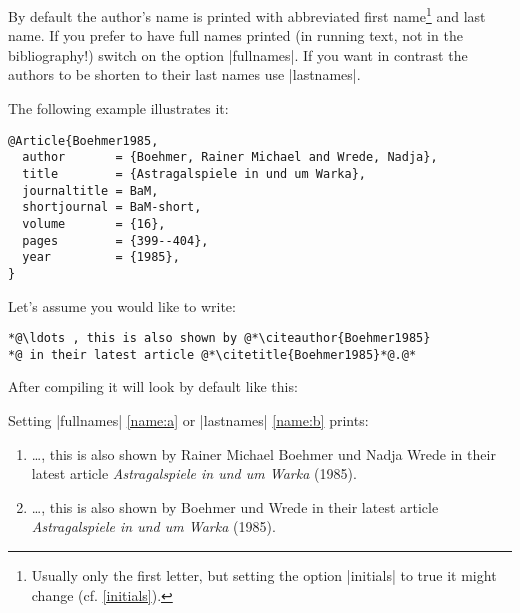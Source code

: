 \documentclass[a4paper,
10pt,
greek,
french,
spanish,
italian,
ngerman,
english
]{ltxdoc}
\begin{document}
By default the author's name is printed with abbreviated first name\footnote{Usually only the first letter, but setting the option |initials| to true it might change (cf. \cref{initials}).} and last name.
If you prefer to have full names printed (in running text, not in the bibliography!) switch on the option |fullnames|.
If you want in contrast the authors to be shorten to their last names use |lastnames|.

The following example illustrates it:

\begin{lstlisting}[style=bibentry,label=Boehmer1985,caption={{@}Article\{Boehmer1985,…\} }]
@Article{Boehmer1985,
  author       = {Boehmer, Rainer Michael and Wrede, Nadja},
  title        = {Astragalspiele in und um Warka},
  journaltitle = BaM,
  shortjournal = BaM-short,
  volume       = {16},
  pages        = {399--404},
  year         = {1985},
}
\end{lstlisting}

Let's assume you would like to write:

\begin{refsection}
\begin{lstlisting}
*@\ldots , this is also shown by @*\citeauthor{Boehmer1985} 
*@ in their latest article @*\citetitle{Boehmer1985}*@.@* \end{lstlisting}

After compiling it will look by default like this: 


Setting |fullnames| \ref{name:a} or |lastnames| \ref{name:b} prints:

\begin{bsp}
\begin{enumerate}
\item\label{name:a} 
\ldots , this is also shown by {\color{red}Rainer Michael Boehmer  und Nadja Wrede} in their latest article \emph{Astragalspiele in und um Warka} (1985).
\item\label{name:b}
\ldots , this is also shown by {\color{red}Boehmer und  Wrede} in their latest article \emph{Astragalspiele in und um Warka} (1985).
\end{enumerate}
\end{bsp}
\end{refsection}
\end{document}
